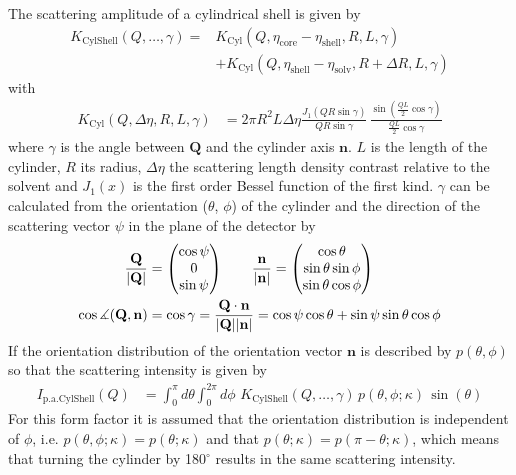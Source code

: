 \noindent The scattering amplitude of a cylindrical shell is given by
\begin{align}
K_\text{CylShell}\left(Q,\dots,\gamma\right)  = &K_\text{Cyl}\left(Q,\eta_\text{core}-\eta_\text{shell},R,L,\gamma\right) \\
& +  K_\text{Cyl}\left(Q,\eta_\text{shell}-\eta_\text{solv},R+\Delta
R,L,\gamma\right)
\end{align}
with
\begin{align}
K_\text{Cyl}(Q,\Delta\eta,R,L,\gamma) & = 2 \pi R^2 L \Delta \eta
    \frac{J_1\left(Q R \sin\gamma\right)}{Q R \sin\gamma} \,
    \frac{\sin\left(\frac{QL}{2} \cos\gamma\right)}{\frac{QL}{2} \cos\gamma}
\end{align}
where $\gamma$ is the angle between $\mathbf{Q}$ and the cylinder
axis $\mathbf{n}$. $L$ is the length of the cylinder, $R$ its
radius, $\Delta\eta$ the scattering length density contrast relative
to the solvent and $J_1(x)$ is the first order Bessel function of
the first kind. $\gamma$ can be calculated from the orientation
($\theta$, $\phi$) of the cylinder and the direction of the
scattering vector $\psi$ in the plane of the detector by
\begin{align}
\frac{\mathbf{Q}}{\abs{\mathbf{Q}}} &=
\begin{pmatrix}
\cos \psi \\
0  \\
\sin \psi
\end{pmatrix} \qquad
\frac{\mathbf{n}}{\abs{\mathbf{n}}} =
\begin{pmatrix}
\cos \theta \\
\sin \theta \sin \phi  \\
\sin \theta \cos \phi
\end{pmatrix} \\
\cos \measuredangle(\mathbf{Q,n}) &= \cos \gamma = \frac{\mathbf{Q\cdot
n}}{\abs{\mathbf{Q}}\abs{\mathbf{n}}} = \cos\psi \cos\theta +
\sin\psi \sin\theta \cos\phi
\end{align}
If the orientation distribution of the orientation vector $\mathbf{n}$ is described by $p(\theta,\phi)$
so that the scattering intensity is given by
\begin{align}
I_\mathrm{p.a.CylShell}(Q) & =
            \int_0^\pi d\theta \int_0^{2\pi} d\phi \, \,
                K_\text{CylShell}\left(Q,\dots,\gamma\right)\,p(\theta,\phi;\kappa)\,\sin(\theta)
\end{align}
For this form factor it is assumed that the orientation distribution is independent of $\phi$,
i.e. $p(\theta,\phi;\kappa)=p(\theta;\kappa)$ and that $p(\theta;\kappa)=p(\pi-\theta;\kappa)$, which means that turning the cylinder by 180$^\circ$ results in the same scattering intensity. 

